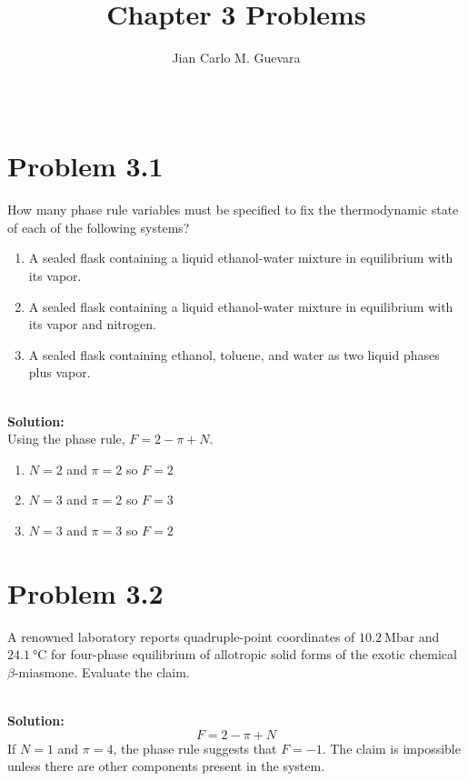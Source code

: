 \documentclass{article}
\title{Chapter 3 Problems}
\author{Jian Carlo M. Guevara}
\date{~}
\newenvironment{solution}{\par\noindent\textbf{\\Solution:\\}}{\par\medskip}
\begin{document}
\maketitle
\vspace{-3em}
\tableofcontents

\section*{Problem 3.1}
How many phase rule variables must be specified to fix the
thermodynamic state of each of the following systems?
\begin{enumerate}[label=(\alph*)]
  \item A sealed flask containing a liquid ethanol-water mixture in
    equilibrium with its vapor.
  \item A sealed flask containing a liquid ethanol-water mixture in
    equilibrium with its vapor and nitrogen.
  \item A sealed flask containing ethanol, toluene, and water as two
    liquid phases plus vapor.
\end{enumerate}

\begin{solution}
  Using the phase rule, $F=2-\pi+N$.
  \begin{enumerate}[label=(\alph*)]
    \item $N=2$ and $\pi=2$ so $\boxed{ F=2 }$
    \item $N=3$ and $\pi=2$ so $\boxed{ F=3 }$
    \item $N=3$ and $\pi=3$ so $\boxed{ F=2 }$
  \end{enumerate}
\end{solution}

\section*{Problem 3.2}
A renowned laboratory reports quadruple-point coordinates of
$10.2~\unit{\mega\bar}$ and $24.1~\unit{\degreeCelsius}$ for
four-phase equilibrium of allotropic solid forms of the exotic
chemical $\beta$-miasmone. Evaluate the claim.

\begin{solution}
  \begin{equation*}
    F=2-\pi+N
  \end{equation*}
  If $N=1$ and $\pi=4$, the phase rule suggests that $F=-1$. The
  claim is impossible unless there are other components present in the system.
\end{solution}
\end{document}
